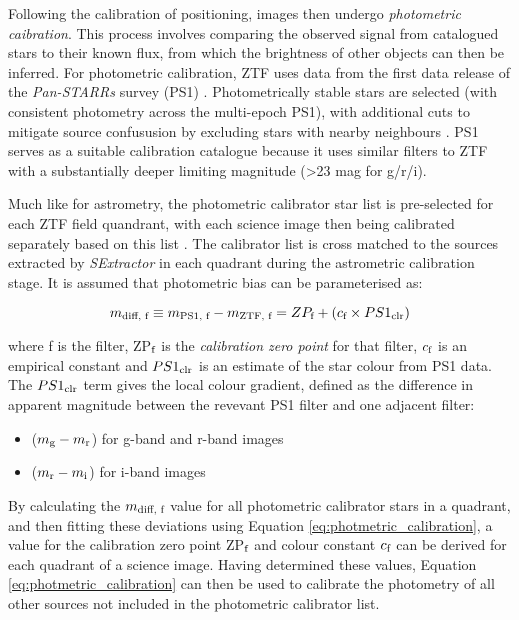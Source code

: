 Following the calibration of positioning, images then undergo \emph{photometric caibration}. This process involves comparing the observed signal from catalogued stars to their known flux, from which the brightness of other objects can then be inferred. For photometric calibration, ZTF uses data from the first data release of the \emph{Pan-STARRs} survey (PS1) . Photometrically stable stars are selected (with consistent photometry across the multi-epoch PS1), with additional cuts to mitigate source confususion by excluding stars with nearby neighbours \cite{ztf_data_processing}. PS1 serves as a suitable calibration catalogue because it uses similar filters to ZTF with a substantially deeper limiting magnitude (>23 mag for g/r/i).

Much like for astrometry, the photometric calibrator star list is pre-selected for each ZTF field quandrant, with each science image then being calibrated separately based on this list \cite{ztf_data_processing}.  The calibrator list is cross matched to the sources extracted by \emph{SExtractor} in each quadrant during the astrometric calibration stage. It is assumed that photometric bias can be parameterised as:

\begin{equation}
	m_{\textup{diff, f}} \equiv m_{\textup{PS1, f}} - m_{\textup{ZTF, f}} = ZP_{\textup{f}} + \left( c_{\textup{f}} \times PS1_{\textup{clr}} \right)
	\label{eq:photmetric_calibration}
\end{equation}

where f is the filter, ZP$_{\textup{f}}$ is the \emph{calibration zero point} for that filter, $c_{\textup{f}}$ is an empirical constant and $PS1_{\textup{clr}}$ is an estimate of the star colour from PS1 data. The $PS1_{\textup{clr}}$ term gives the local colour gradient, defined as the difference in apparent magnitude between the revevant PS1 filter and one adjacent filter:

\begin{itemize}
	\item ($m_{\textup{g}} - m_{\textup{r}}$) for g-band and r-band images
	\item ($m_{\textup{r}} - m_{\textup{i}}$) for i-band images
\end{itemize}

By calculating the $m_{\textup{diff, f}}$ value for all photometric calibrator stars in a quadrant, and then fitting these deviations using Equation \ref{eq:photmetric_calibration}, a value for the calibration zero point ZP$_{\textup{f}}$ and colour constant $c_{\textup{f}}$ can be derived for each quadrant of a science image. Having determined these values, Equation \ref{eq:photmetric_calibration} can then be used to calibrate the photometry of all other sources not included in the photometric calibrator list.

